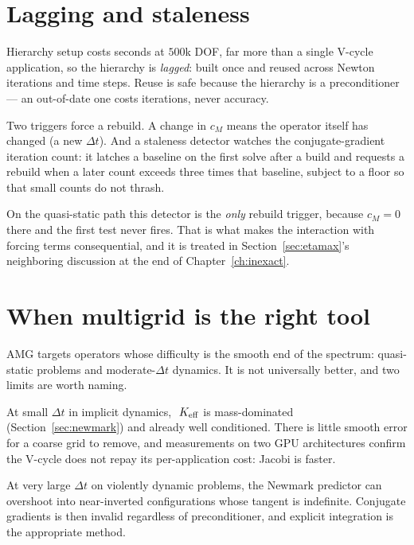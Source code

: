 \section{Lagging and staleness}
\label{sec:amg-lagging}

Hierarchy setup costs seconds at $500$k DOF, far more than a single V-cycle
application, so the hierarchy is \emph{lagged}: built once and reused across
Newton iterations and time steps.  Reuse is safe because the hierarchy is a
preconditioner --- an out-of-date one costs iterations, never accuracy.

Two triggers force a rebuild.  A change in $c_M$ means the operator itself has
changed (a new $\Delta t$).  And a staleness detector watches the
conjugate-gradient iteration count: it latches a baseline on the first solve
after a build and requests a rebuild when a later count exceeds three times
that baseline, subject to a floor so that small counts do not thrash.

On the quasi-static path this detector is the \emph{only} rebuild trigger,
because $c_M = 0$ there and the first test never fires.  That is what makes the
interaction with forcing terms consequential, and it is treated in
Section~\ref{sec:etamax}'s neighboring discussion at the end of
Chapter~\ref{ch:inexact}.

\section{When multigrid is the right tool}
\label{sec:amg-when}

AMG targets operators whose difficulty is the smooth end of the spectrum:
quasi-static problems and moderate-$\Delta t$ dynamics.  It is not universally
better, and two limits are worth naming.

At small $\Delta t$ in implicit dynamics, $~K_{\mathrm{eff}}$ is mass-dominated
(Section~\ref{sec:newmark}) and already well conditioned.  There is little
smooth error for a coarse grid to remove, and measurements on two GPU
architectures confirm the V-cycle does not repay its per-application cost:
Jacobi is faster.

At very large $\Delta t$ on violently dynamic problems, the Newmark predictor
can overshoot into near-inverted configurations whose tangent is indefinite.
Conjugate gradients is then invalid regardless of preconditioner, and explicit
integration is the appropriate method.
